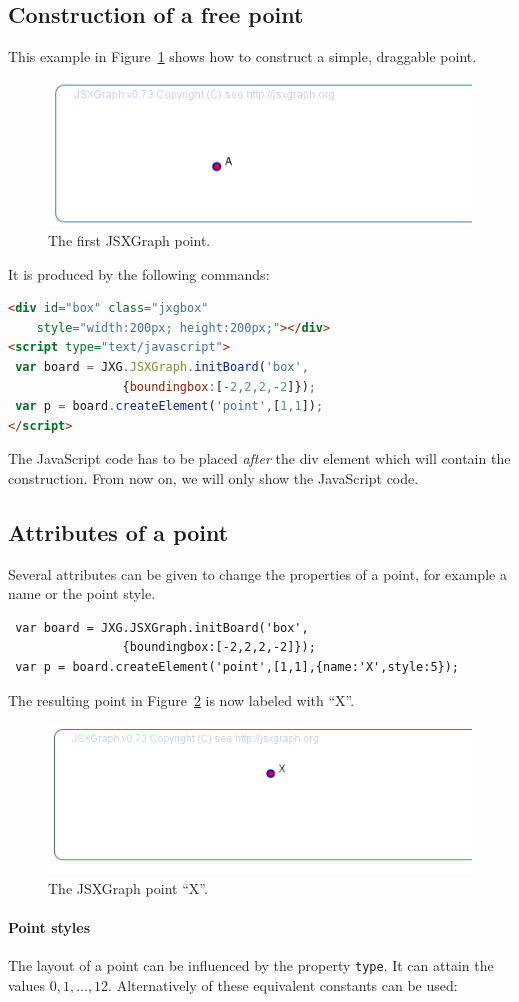 \documentclass[a4paper]{tufte-book}
\begin{document}
\subsection{Construction of a free point}
This example in Figure~\ref{fig:2} shows how to construct a simple, draggable point. 
\begin{figure}[htb]
\centerline{\includegraphics[width=0.4\linewidth]{images/b3.png}}
\caption{The first JSXGraph point.}\label{fig:2}
\end{figure}
It is produced by the following commands:
\begin{lstlisting}[language=html]
<div id="box" class="jxgbox" 
    style="width:200px; height:200px;"></div>
<script type="text/javascript">
 var board = JXG.JSXGraph.initBoard('box', 
                {boundingbox:[-2,2,2,-2]});
 var p = board.createElement('point',[1,1]);
</script>
\end{lstlisting}

The JavaScript code has to be placed {\sl after} the div element which will contain the construction. From now on, we will only show the JavaScript code. 

\subsection{Attributes of a point}
Several attributes can be given to change the properties of a point, for example a name or the point style. 
\begin{lstlisting}
 var board = JXG.JSXGraph.initBoard('box', 
                {boundingbox:[-2,2,2,-2]});
 var p = board.createElement('point',[1,1],{name:'X',style:5});
\end{lstlisting}
The resulting point in Figure~\ref{fig:3} is now labeled with ``X''.
\begin{figure}[htb]
\centerline{\includegraphics[width=0.4\linewidth]{images/b4.png}}
\caption{The JSXGraph point ``X''.}\label{fig:3}
\end{figure}

\paragraph{Point styles}
The layout of a point can be influenced by the property \lstinline|type|. It can attain the values $0,1,\ldots,12$. 
Alternatively of these equivalent constants can be used:
\end{document}
